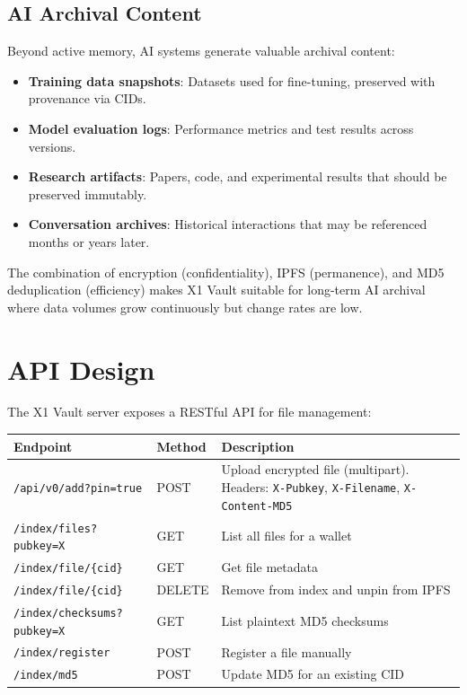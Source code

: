 \documentclass[11pt,a4paper]{article}
\begin{document}
\subsection{AI Archival Content}

Beyond active memory, AI systems generate valuable archival content:

\begin{itemize}
    \item \textbf{Training data snapshots}: Datasets used for fine-tuning, preserved with provenance via CIDs.
    \item \textbf{Model evaluation logs}: Performance metrics and test results across versions.
    \item \textbf{Research artifacts}: Papers, code, and experimental results that should be preserved immutably.
    \item \textbf{Conversation archives}: Historical interactions that may be referenced months or years later.
\end{itemize}

The combination of encryption (confidentiality), IPFS (permanence), and MD5 deduplication (efficiency) makes X1 Vault suitable for long-term AI archival where data volumes grow continuously but change rates are low.

\section{API Design}

The X1 Vault server exposes a RESTful API for file management:

\begin{center}
\begin{tabularx}{\textwidth}{llX}
\hline
\textbf{Endpoint} & \textbf{Method} & \textbf{Description} \\
\hline
\texttt{/api/v0/add?pin=true} & POST & Upload encrypted file (multipart). Headers: \texttt{X-Pubkey}, \texttt{X-Filename}, \texttt{X-Content-MD5} \\
\texttt{/index/files?pubkey=X} & GET & List all files for a wallet \\
\texttt{/index/file/\{cid\}} & GET & Get file metadata \\
\texttt{/index/file/\{cid\}} & DELETE & Remove from index and unpin from IPFS \\
\texttt{/index/checksums?pubkey=X} & GET & List plaintext MD5 checksums \\
\texttt{/index/register} & POST & Register a file manually \\
\texttt{/index/md5} & POST & Update MD5 for an existing CID \\
\hline
\end{tabularx}
\end{center}
\end{document}

